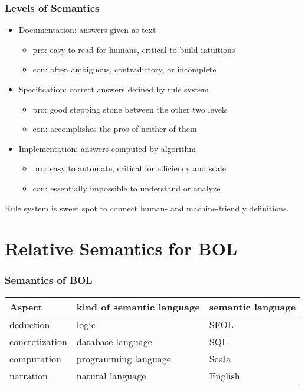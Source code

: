 \begin{frame}\frametitle{Levels of Semantics}
\begin{itemize}
\item Documentation: answers given as text
\begin{itemize}
\item pro: easy to read for humans, critical to build intuitions
\item con: often ambiguous, contradictory, or incomplete
\end{itemize}
\item Specification: correct answers defined by rule system 
\begin{itemize}
\item pro: good stepping stone between the other two levels
\item con: accomplishes the pros of neither of them
\end{itemize}
\item Implementation: answers computed by algorithm
\begin{itemize}
\item pro: easy to automate, critical for efficiency and scale
\item con: essentially impossible to understand or analyze
\end{itemize}
\end{itemize}

Rule system is sweet spot to connect human- and machine-friendly definitions.
\end{frame}


\section{Relative Semantics for BOL}

\begin{frame}\frametitle{Semantics of BOL}
\begin{center}
\begin{tabular}{lll}
Aspect & kind of semantic language & semantic language\\
\hline 
deduction & logic & SFOL \\
concretization & database language & SQL \\
computation & programming language & Scala \\
narration & natural language & English \\
\end{tabular}
\end{center}
\end{frame}

